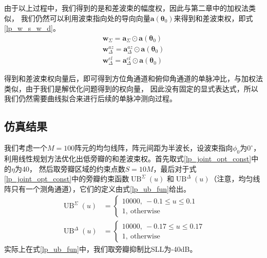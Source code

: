 \documentclass[master]{thesis-uestc}
\begin{document}
由于以上过程中，我们得到的是和差波束的幅度权，因此与第二章中的加权法类似，
我们仍然可以利用波束指向处的导向向量$\bm{a}(\bm{\theta}_0)$来得到和差波束权，即式\eqref{lp_w_s_w_d}。
\begin{subequations}\label{lp_w_s_w_d}
    \begin{align}
        \bm{w}_\Sigma = \bm{a}_\Sigma \odot \bm{a}(\bm{\theta}_0) \\
        \bm{w}_\Delta^{az} = \bm{a}_\Delta^{az} \odot \bm{a}(\bm{\theta}_0) \\
        \bm{w}_\Delta^{el} = \bm{a}_\Delta^{el} \odot \bm{a}(\bm{\theta}_0) 
    \end{align}
\end{subequations}

得到和差波束权向量后，即可得到方位角通道和俯仰角通道的单脉冲比，与加权法类似，由于我们是解优化问题得到的权向量，
因此没有固定的显式表达式，所以我们仍然需要曲线拟合来进行后续的单脉冲测向过程。

\subsection{仿真结果}
我们考虑一个$M=100$阵元的均匀线阵，阵元间距为半波长，设波束指向$\phi_0$为$0^\circ$，
利用线性规划方法优化出低旁瓣的和差波束权。首先取式\eqref{lp_joint_opt_const}中的$\eta$为40，
然后取旁瓣区域的约束点数$S=10M$，最后对于式\eqref{lp_joint_opt_const}中的旁瓣约束函数$\operatorname{UB}^\Sigma(u)$
和$\operatorname{UB}^\Delta(u)$（注意，均匀线阵只有一个测角通道），它们的定义由式\eqref{lp_ub_fun}给出。
\begin{subequations}\label{lp_ub_fun}
    \begin{align}
        \operatorname{UB}^\Sigma(u) &= 
        \begin{cases}
            10000, ~ -0.1\leqslant u \leqslant 0.1 \\
            1, ~ \text{otherwise}
        \end{cases} \\
        \operatorname{UB}^\Delta(u) &= 
        \begin{cases}
            10000, ~ -0.17\leqslant u \leqslant 0.17 \\
            1, ~ \text{otherwise}
        \end{cases}
    \end{align}
\end{subequations}
实际上在式\eqref{lp_ub_fun}中，我们取旁瓣抑制比SLL为-40dB。
\end{document}
